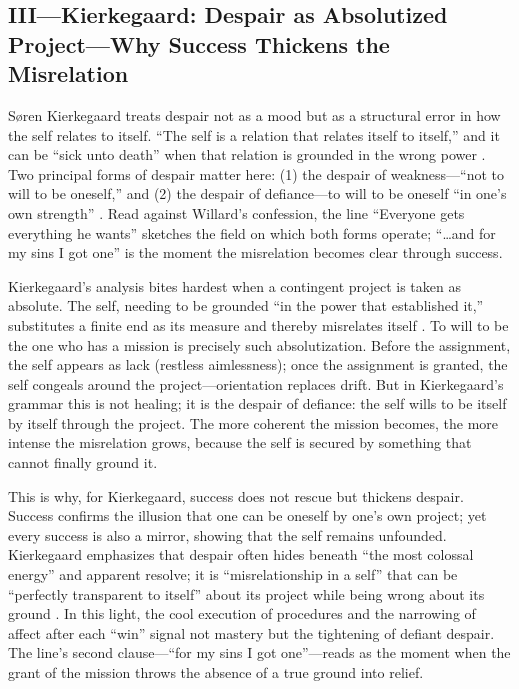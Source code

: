 \subsection*{III—Kierkegaard: Despair as Absolutized Project—Why Success Thickens the
	Misrelation}
\label{ssec:iii-kierkegaard}
Søren Kierkegaard treats despair not as a mood but as a structural error in how the self relates
to itself. ``The self is a relation that relates itself to itself,'' and it can be ``sick unto
death'' when that relation is grounded in the wrong power
\parencite[pp.~49--52]{KierkegaardSUD1980}.
Two principal forms of despair matter here: (1) the despair of weakness—``not to will to be
oneself,'' and (2) the despair of defiance—to will to be oneself ``in one's own strength''
\parencite[pp.~52--61, 69--73]{KierkegaardSUD1980}. Read against Willard's confession, the line
``Everyone gets everything he wants'' sketches the field on which both forms operate;
``\ldots and for my sins I got one'' is the moment the misrelation becomes clear through
success.

Kierkegaard's analysis bites hardest when a contingent project is taken as absolute. The self,
needing to be grounded ``in the power that established it,'' substitutes a finite end as its
measure and thereby misrelates itself \parencite[pp.~79--83]{KierkegaardSUD1980}. To will to be
the one who has a mission is precisely such absolutization. Before the assignment, the self
appears as lack (restless aimlessness); once the assignment is granted, the self congeals around
the project—orientation replaces drift. But in Kierkegaard's grammar this is not healing; it is
the despair of defiance: the self wills to be itself by itself through the project. The more
coherent the mission becomes, the more intense the misrelation grows, because the self is
secured by something that cannot finally ground it.

This is why, for Kierkegaard, success does not rescue but thickens despair. Success confirms
the illusion that one can be oneself by one's own project; yet every success is also a mirror,
showing that the self remains unfounded. Kierkegaard emphasizes that despair often hides beneath
``the most colossal energy'' and apparent resolve; it is ``misrelationship in a self'' that can
be ``perfectly transparent to itself'' about its project while being wrong about its ground
\parencite[pp.~72--76]{KierkegaardSUD1980}. In this light, the cool execution of procedures and
the narrowing of affect after each ``win'' signal not mastery but the tightening of defiant
despair. The line's second clause—``for my sins I got one''—reads as the moment when the grant
of the mission throws the absence of a true ground into relief.

